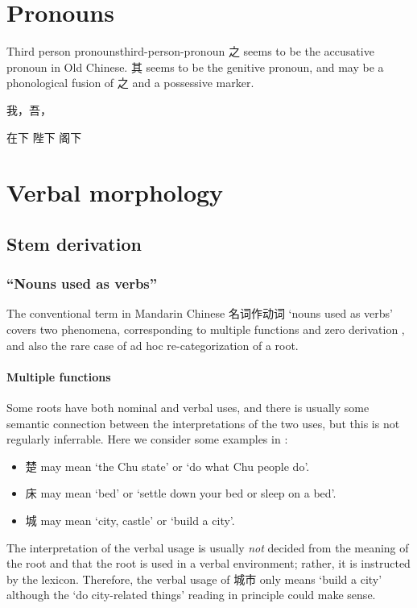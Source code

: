 \documentclass[UTF8, a4paper, oneside, scheme=plain, 12pt]{ctexrep}
\newcommand*{\citesec}[1]{\S~{#1}}
\newcommand{\translate}[1]{`#1'}
\begin{document}
\chapter{Pronouns}

\begin{todobox}{Third person pronouns}{third-person-pronoun}
    之 seems to be the accusative pronoun in Old Chinese.
    其 seems to be the genitive pronoun,
    and may be a phonological fusion of 之 and a possessive marker.
    
    我，吾，

    在下 陛下 阁下
\end{todobox}

\chapter{Verbal morphology}

\section{Stem derivation}

\subsection{``Nouns used as verbs''}\label{sec:pos.verb.noun-to-verb}

The conventional term in Mandarin Chinese 名词作动词 \translate{nouns used as verbs} covers two phenomena,
corresponding to multiple functions and zero derivation \citep[\citesec{11.3}]{dixon2010basic2},
and also the rare case of ad hoc re-categorization of a root.

\subsubsection{Multiple functions}

Some roots have both nominal and verbal uses,
and there is usually some semantic connection between the interpretations of the two uses,
but this is not regularly inferrable. 
Here we consider some examples in \citet{yang1991dict}:
\begin{itemize}
    \item 楚 may mean \translate{the Chu state} or \translate{do what Chu people do}.
    \item 床 may mean \translate{bed} or \translate{settle down your bed or sleep on a bed}.
    \item 城 may mean \translate{city, castle} or \translate{build a city}.
\end{itemize}
The interpretation of the verbal usage is usually \emph{not} decided
from the meaning of the root and that the root is used in a verbal environment;
rather, it is instructed by the lexicon.
Therefore, the verbal usage of 城市 only means \translate{build a city}
although the \translate{do city-related things} reading in principle could make sense. 
\end{document}
